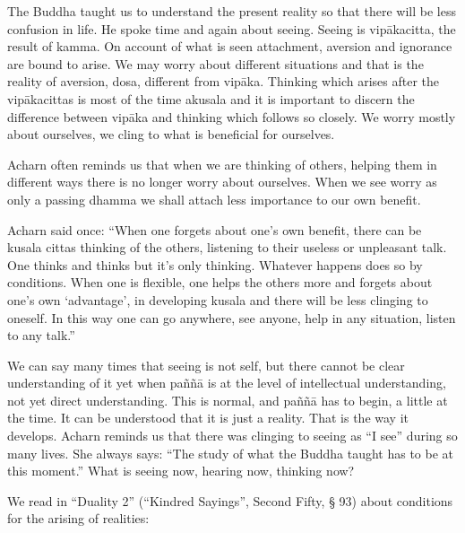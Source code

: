 \documentclass{book}
\begin{document}
The Buddha taught us to understand the
present reality so that there will be less confusion in life. He spoke
time and again about seeing. Seeing is vipākacitta, the result of kamma.
On account of what is seen attachment, aversion and ignorance are bound
to arise. We may worry about different situations and that is the
reality of aversion, dosa, different from vipāka. Thinking which arises
after the vipākacittas is most of the time akusala and it is important
to discern the difference between vipāka and thinking which follows so
closely. We worry mostly about ourselves, we cling to what is beneficial
for ourselves. 

Acharn often reminds us that when we are
thinking of others, helping them in different ways there is no longer
worry about ourselves. When we see worry as only a passing dhamma we
shall attach less importance to our own benefit. 

Acharn said once:
``When one forgets about one's own
benefit, there can be kusala cittas thinking of the others, listening to
their useless or unpleasant talk. One thinks and thinks but it's only
thinking. Whatever happens does so by conditions. When one is flexible,
one helps the others more and forgets about one's own
`advantage',
in developing kusala and
there will be less clinging
to oneself. In this way one
can go anywhere, see anyone, help in any situation, listen to any
talk.''

We can say many times
that seeing is not self, but there cannot be clear understanding of it
yet when paññā is at the
level of intellectual understanding, not yet direct understanding. This
is normal, and paññā has to
begin, a little at the time. It can be understood that it is just a
reality. That is the way it develops. Acharn reminds us that there was
clinging to seeing as ``I see''
during so many lives. She always says:
``The study of what the
Buddha taught has to be at this
moment.'' What is seeing
now, hearing now, thinking now?

We read in ``Duality 2'' (``Kindred
Sayings'', Second Fifty, § 93) about conditions for the arising of
realities:
\end{document}
